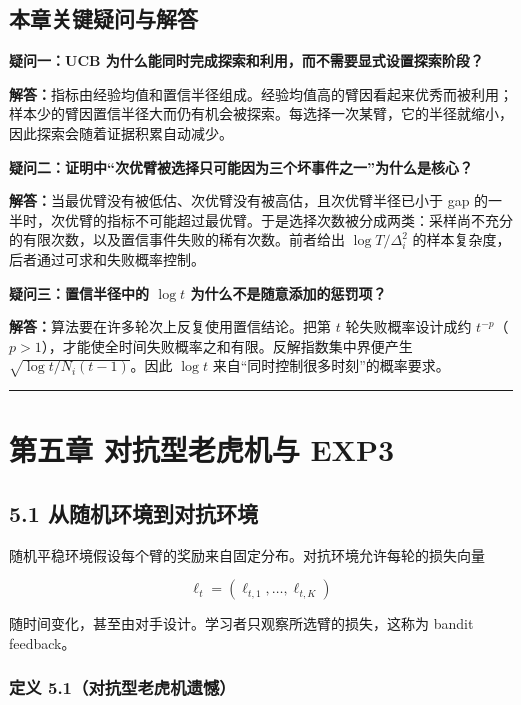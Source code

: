 \documentclass[
  11pt,
  a4paper,
]{ctexart}
\begin{document}
\fi
\subsection{本章关键疑问与解答}\label{ux672cux7ae0ux5173ux952eux7591ux95ee-3}

\textbf{疑问一：UCB 为什么能同时完成探索和利用，而不需要显式设置探索阶段？}

\textbf{解答：}指标由经验均值和置信半径组成。经验均值高的臂因看起来优秀而被利用；样本少的臂因置信半径大而仍有机会被探索。每选择一次某臂，它的半径就缩小，因此探索会随着证据积累自动减少。

\textbf{疑问二：证明中“次优臂被选择只可能因为三个坏事件之一”为什么是核心？}

\textbf{解答：}当最优臂没有被低估、次优臂没有被高估，且次优臂半径已小于 gap 的一半时，次优臂的指标不可能超过最优臂。于是选择次数被分成两类：采样尚不充分的有限次数，以及置信事件失败的稀有次数。前者给出 \(\log T/\Delta_i^2\) 的样本复杂度，后者通过可求和失败概率控制。

\textbf{疑问三：置信半径中的 \(\log t\) 为什么不是随意添加的惩罚项？}

\textbf{解答：}算法要在许多轮次上反复使用置信结论。把第 \(t\) 轮失败概率设计成约 \(t^{-p}\)（\(p>1\)），才能使全时间失败概率之和有限。反解指数集中界便产生 \(\sqrt{\log t/N_i(t-1)}\)。因此 \(\log t\) 来自“同时控制很多时刻”的概率要求。

\begin{center}\rule{0.5\linewidth}{0.5pt}\end{center}

\section{第五章 对抗型老虎机与
EXP3}\label{ux7b2cux4e94ux7ae0-ux5bf9ux6297ux578bux8001ux864eux673aux4e0e-exp3}

\subsection{5.1
从随机环境到对抗环境}\label{ux4eceux968fux673aux73afux5883ux5230ux5bf9ux6297ux73afux5883}

随机平稳环境假设每个臂的奖励来自固定分布。对抗环境允许每轮的损失向量

\[
\ell_t=(\ell_{t,1},\ldots,\ell_{t,K})
\]

随时间变化，甚至由对手设计。学习者只观察所选臂的损失，这称为 bandit
feedback。

\subsubsection{定义
5.1（对抗型老虎机遗憾）}\label{ux5b9aux4e49-5.1ux5bf9ux6297ux578bux8001ux864eux673aux9057ux61be}
\end{document}
